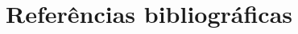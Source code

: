 \documentclass[aspectratio=169]{beamer}
\begin{document}
\section{Referências bibliográficas}

%	
%	
%	
%	
%	
%	
%	
%	
%	
\end{document}
